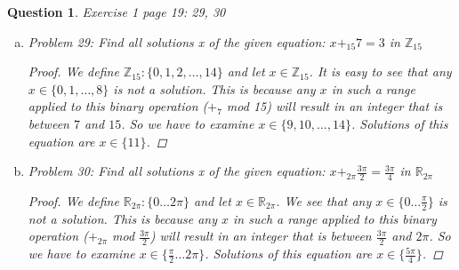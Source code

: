 \documentclass{article}
\newcommand*{\field}[1]{\mathbb{#1}}%
\newtheorem{ques}{Question}
\begin{document}
\begin{ques}
	Exercise 1 page 19: 29, 30 
\begin{enumerate}[(a)]
	\item 
	Problem 29: Find all solutions x of the given equation: $x +_{15} 7 = 3$ in ${\field{Z}_{15}}$
	\begin{proof}
		We define ${\field{Z}_{15}} : \{0, 1, 2, \dots, 14\}$ and let $x \in {\field{Z}_{15}}$. It is easy to see that any $x \in \{0, 1, \dots, 8\}$ is not a solution. This is because any $x$ in such a range applied to this binary operation ($+_7$ mod 15) will result in an integer that is between $7$ and $15$.  So we have to examine $x \in \{9, 10, \dots, 14\}$. Solutions of this equation are $x \in \{11\}$.
	\end{proof}
	
	\item 
	Problem 30: Find all solutions x of the given equation: $x +_{2\pi} {\frac{3\pi}{2}} = \frac{3\pi}{4}$ in ${\field{R}_{2\pi}}$
	\begin{proof}
	We define ${\field{R}_{2\pi}} : \{0 \dots 2\pi\}$ and let $x \in {\field{R}_{2\pi}}$. We see that any $x \in \{0 \dots \frac{\pi}{2}\}$ is not a solution. This is because any $x$ in such a range applied to this binary operation ($+_{2\pi}$ mod $\frac{3\pi}{2}$) will result in an integer that is between $\frac{3\pi}{2}$ and $2\pi$.  So we have to examine $x \in \{\frac{\pi}{2} \dots 2\pi\}$. Solutions of this equation are $x \in \{\frac{5\pi}{4}\}$.
	\end{proof}
\end{enumerate}
\end{ques}
\end{document}
